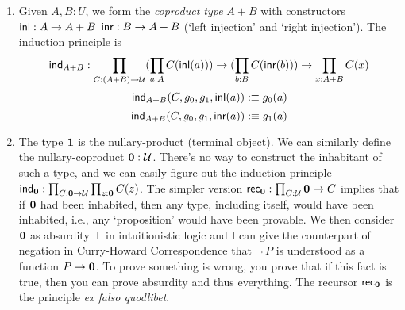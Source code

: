 \begin{enumerate}
    \item Given $A, B:U$, we form the {\it coproduct type} $A+B$ with
    constructors $\text{\sf inl}:A\to A+B$ $\text{\sf inr}:B\to A+B$ (`left injection' and
    `right injection'). The induction principle is
    $$
        \text{\sf ind}_{A+B}: \prod_{C:(A+B)\to\mathcal{U}}
            (\prod_{a:A}C(\text{\sf inl}(a))) \to
            (\prod_{b:B}C(\text{\sf inr}(b))) \to
            \prod_{x:A+B} C(x)
    $$
    $$
        \text{\sf ind}_{A+B}(C,g_0,g_1,\text{\sf inl}(a)):\equiv g_0(a)
    $$
    $$
        \text{\sf ind}_{A+B}(C,g_0,g_1,\text{\sf inr}(a)):\equiv g_1(a)
    $$
    \item The type $\mathbf{1}$ is the nullary-product (terminal object). We 
    can similarly define the nullary-coproduct $\mathbf{0}:\mathcal{U}$. There's
    no way to construct the inhabitant of such a type, and we can easily
    figure out the induction principle 
    $\text{\sf ind}_{\mathbf{0}}: \prod_{C:\mathbf{0}\to\mathcal{U}}\prod_{z:\mathbf{0}}C(z)$. The
    simpler version $\text{\sf rec}_{\mathbf{0}}:\prod_{C:\mathcal{U}}\mathbf{0}\to C$ implies
    that if $\mathbf{0}$ had been inhabited, then any type, including itself, 
    would have been inhabited, i.e., any `proposition' would have been 
    provable. We then consider $\mathbf{0}$ as absurdity $\bot$ in intuitionistic
    logic and I can give the counterpart of negation in Curry-Howard 
    Correspondence that $\neg\ P$ is understood as a function $P\to\mathbf{0}$.
    To prove something is wrong, you prove that if this fact is true, 
    then you can prove absurdity and thus everything. The recursor 
    $\text{\sf rec}_{\mathbf{0}}$ is the principle {\it ex falso quodlibet}.


\end{enumerate}

